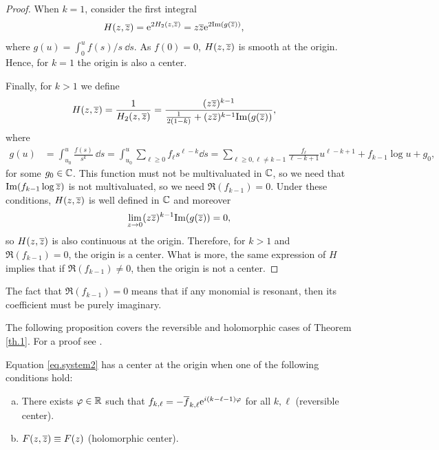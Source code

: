 \begin{theorem}
\begin{proof}
When $k=1$, consider the first integral
\begin{align*}
H(z,\overline{z})&=\mathrm{e}^{2H_2(z,\overline{z})}=z\overline{z}\mathrm{e}^{2\mathrm{Im}(g(\overline{z}))},
\end{align*}
where $g(u)=\int_0^u f(s)/s~\dd s$. As $f(0)=0$, $H(z,\overline{z})$ is smooth at the origin. Hence, for $k=1$ the origin is also a center.

Finally, for $k>1$ we define
\begin{align*}
H(z,\overline{z})&=\frac{1}{H_2(z,\overline{z})}=\frac{(z\overline{z})^{k-1}}{\frac{1}{2(1-k)}+(z\overline{z})^{k-1}\mathrm{Im}(g(\overline{z}))},
\end{align*}
where
\begin{align*}
g(u) &= \int_{u_0}^u \frac{f(s)}{s^k}~\dd s = \int_{u_0}^u \sum_{\ell\ge0} f_\ell s^{\ell-k}\dd s = \sum_{\ell\ge0,\ell\ne k-1} \frac{f_\ell}{\ell-k+1}u^{\ell-k+1}+f_{k-1}\log u+g_0,
\end{align*}
for some $g_0\in\mathbb{C}$. This function must not be multivaluated in $\mathbb{C}$, so we need that $\mathrm{Im}(f_{k-1}\log\overline{z})$ is not multivaluated, so we need $\Re(f_{k-1})=0$. Under these conditions, $H(z,\overline{z})$ is well defined in $\mathbb{C}$ and moreover
\begin{align*}
\lim_{z\to0}(z\overline{z})^{k-1}\mathrm{Im}(g(\overline{z}))=0,
\end{align*}
so $H(z,\overline{z})$ is also continuous at the origin. Therefore, for $k>1$ and $\Re(f_{k-1})=0$, the origin is a center. What is more, the same expression of $H$ implies that if $\Re(f_{k-1})\ne0$, then the origin is not a center.
\end{proof}
\end{theorem}

\begin{observacio}
The fact that $\Re(f_{k-1})=0$ means that if any monomial is resonant, then its coefficient must be purely imaginary.
\end{observacio}




The following proposition covers the reversible and holomorphic cases of Theorem \ref{th.1}. For a proof see \textcite{Cima1997,Gasull2016}.
\begin{proposition}
Equation \eqref{eq.system2} has a center at the origin when one of the following conditions hold:
\begin{enumerate}[(a)]
\item
There exists $\varphi\in\mathbb{R}$ such that $f_{k,\ell}=-\overline f_{k,\ell}\mathrm{e}^{i(k-\ell-1)\varphi}$ for all $k,\ell$ (reversible center).
\item
$F(z,\overline{z})\equiv F(z)$ (holomorphic center).
\end{enumerate}
\label{prop.1}


\end{proposition}


